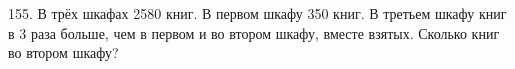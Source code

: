 155. В трёх шкафах 2580 книг. В первом шкафу 350 книг. В третьем шкафу книг в 3 раза  больше, чем в первом и во втором шкафу, вместе взятых. Сколько книг во втором шкафу?\\
